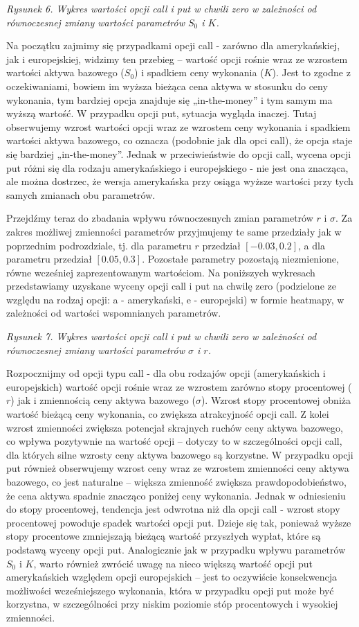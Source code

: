 \documentclass[
]{article}
\begin{document}
\emph{Rysunek 6. Wykres wartości opcji call i put w chwili zero w
zależności od równoczesnej zmiany wartości parametrów \(S_0\) i \(K\).}

Na początku zajmimy się przypadkami opcji call - zarówno dla
amerykańskiej, jak i europejskiej, widzimy ten przebieg -- wartość opcji
rośnie wraz ze wzrostem wartości aktywa bazowego (\(S_0\)) i spadkiem
ceny wykonania (\(K\)). Jest to zgodne z oczekiwaniami, bowiem im wyższa
bieżąca cena aktywa w stosunku do ceny wykonania, tym bardziej opcja
znajduje się „in-the-money'' i tym samym ma wyższą wartość. W przypadku
opcji put, sytuacja wygląda inaczej. Tutaj obserwujemy wzrost wartości
opcji wraz ze wzrostem ceny wykonania i spadkiem wartości aktywa
bazowego, co oznacza (podobnie jak dla opci call), że opcja staje się
bardziej „in-the-money''. Jednak w przeciwieństwie do opcji call, wycena
opcji put różni się dla rodzaju amerykańskiego i europejskiego - nie
jest ona znacząca, ale można dostrzec, że wersja amerykańska przy osiąga
wyższe wartości przy tych samych zmianach obu parametrów.

Przejdźmy teraz do zbadania wpływu równoczesnych zmian parametrów \(r\)
i \(\sigma\). Za zakres możliwej zmienności parametrów przyjmujemy te
same przedziały jak w poprzednim podrozdziale, tj. dla parametru \(r\)
przedział \([-0.03, 0.2]\), a dla parametru przedział \([0.05, 0.3]\).
Pozostałe parametry pozostają niezmienione, równe wcześniej
zaprezentowanym wartościom. Na poniższych wykresach przedstawiamy
uzyskane wyceny opcji call i put na chwilę zero (podzielone ze względu
na rodzaj opcji: a - amerykański, e - europejski) w formie heatmapy, w
zależności od wartości wspomnianych parametrów.

\emph{Rysunek 7. Wykres wartości opcji call i put w chwili zero w
zależności od równoczesnej zmiany wartości parametrów \(\sigma\) i
\(r\).}

Rozpocznijmy od opcji typu call - dla obu rodzajów opcji (amerykańskich
i europejskich) wartość opcji rośnie wraz ze wzrostem zarówno stopy
procentowej (\(r\)) jak i zmiennością ceny aktywa bazowego (\(\sigma\)).
Wzrost stopy procentowej obniża wartość bieżącą ceny wykonania, co
zwiększa atrakcyjność opcji call. Z kolei wzrost zmienności zwiększa
potencjał skrajnych ruchów ceny aktywa bazowego, co wpływa pozytywnie na
wartość opcji -- dotyczy to w szczególności opcji call, dla których
silne wzrosty ceny aktywa bazowego są korzystne. W przypadku opcji put
również obserwujemy wzrost ceny wraz ze wzrostem zmienności ceny aktywa
bazowego, co jest naturalne -- większa zmienność zwiększa
prawdopodobieństwo, że cena aktywa spadnie znacząco poniżej ceny
wykonania. Jednak w odniesieniu do stopy procentowej, tendencja jest
odwrotna niż dla opcji call - wzrost stopy procentowej powoduje spadek
wartości opcji put. Dzieje się tak, ponieważ wyższe stopy procentowe
zmniejszają bieżącą wartość przyszłych wypłat, które są podstawą wyceny
opcji put. Analogicznie jak w przypadku wpływu parametrów \(S_0\) i
\(K\), warto również zwrócić uwagę na nieco większą wartość opcji put
amerykańskich względem opcji europejskich -- jest to oczywiście
konsekwencja możliwości wcześniejszego wykonania, która w przypadku
opcji put może być korzystna, w szczególności przy niskim poziomie stóp
procentowych i wysokiej zmienności.
\end{document}

